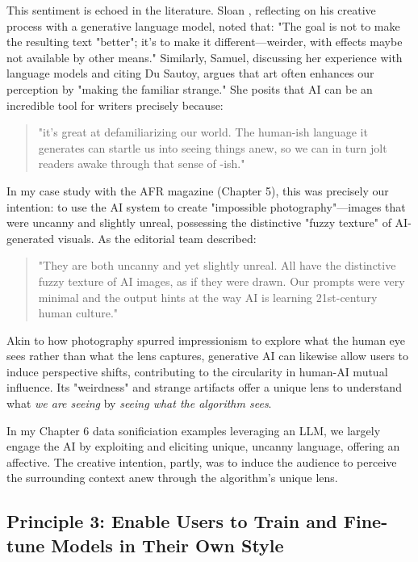 This sentiment is echoed in the literature. Sloan \cite{Sloan2016-fj}, reflecting on his creative process with a generative language model, noted that: "The goal is not to make the resulting text "better"; it's to make it different—weirder, with effects maybe not available by other means." Similarly, Samuel, discussing her experience with language models and citing Du Sautoy, argues that art often enhances our perception by "making the familiar strange." She posits that AI can be an incredible tool for writers precisely because:

\begin{quote}
"it's great at defamiliarizing our world. The human-ish language it generates can startle us into seeing things anew, so we can in turn jolt readers awake through that sense of -ish."
\end{quote}

In my case study with the AFR magazine (Chapter 5), this was precisely our intention: to use the AI system to create "impossible photography"—images that were uncanny and slightly unreal, possessing the distinctive "fuzzy texture" of AI-generated visuals. As the editorial team described:

\begin{quote}
"They are both uncanny and yet slightly unreal. All have the distinctive fuzzy texture of AI images, as if they were drawn. Our prompts were very minimal and the output hints at the way AI is learning 21st-century human culture."
\end{quote}

Akin to how photography spurred impressionism to explore what the human eye sees rather than what the lens captures, generative AI can likewise allow users to induce perspective shifts, contributing to the circularity in human-AI mutual influence. Its "weirdness" and strange artifacts offer a unique lens to understand what \textit{we are seeing} by \textit{seeing what the algorithm sees}. 

In my Chapter 6 data sonificiation examples leveraging an LLM, we largely engage the AI by exploiting and eliciting unique, uncanny language, offering an affective. The creative intention, partly, was to induce the audience to perceive the surrounding context anew through the algorithm's unique lens.

\subsection{Principle 3: Enable Users to Train and Fine-tune Models in Their Own Style}

